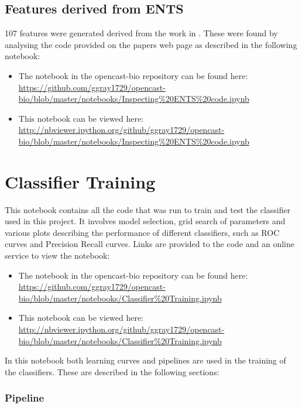 \subsection{Features derived from ENTS}

107 features were generated derived from the work in \textcite{rodgers-melnick_predicting_2013}.
These were found by analysing the code provided on the papers web page as described in the following notebook:

\begin{itemize}
    \item The notebook in the opencast-bio repository can be found here: \url{https://github.com/ggray1729/opencast-bio/blob/master/notebooks/Inspecting%20ENTS%20code.ipynb}
        \item This notebook can be viewed here: \url{http://nbviewer.ipython.org/github/ggray1729/opencast-bio/blob/master/notebooks/Inspecting%20ENTS%20code.ipynb}
\end{itemize}

\section{Classifier Training}
\label{app:classtrain}

This notebook contains all the code that was run to train and test the classifier used in this project.
It involves model selection, grid search of parameters and various plots describing the performance of different classifiers, such as \ac{ROC} curves and Precision Recall curves.
Links are provided to the code and an online service to view the notebook:

\begin{itemize}
    \item The notebook in the opencast-bio repository can be found here: \url{https://github.com/ggray1729/opencast-bio/blob/master/notebooks/Classifier%20Training.ipynb}
        \item This notebook can be viewed here: \url{http://nbviewer.ipython.org/github/ggray1729/opencast-bio/blob/master/notebooks/Classifier%20Training.ipynb}
\end{itemize}

In this notebook both learning curves and pipelines are used in the training of the classifiers.
These are described in the following sections:

\subsubsection*{Pipeline}

